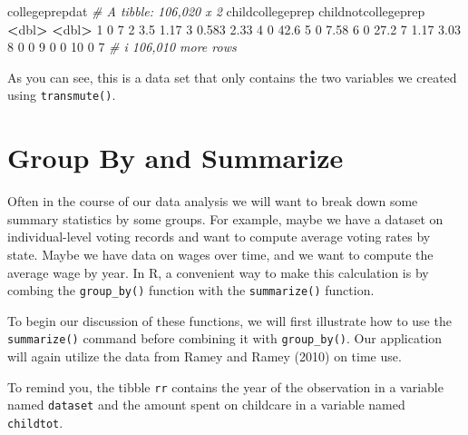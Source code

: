 \documentclass[
]{book}
\newenvironment{Shaded}{\begin{snugshade}}{\end{snugshade}}
\newcommand{\CommentTok}[1]{\textcolor[rgb]{0.56,0.35,0.01}{\textit{#1}}}
\newcommand{\DecValTok}[1]{\textcolor[rgb]{0.00,0.00,0.81}{#1}}
\newcommand{\ErrorTok}[1]{\textcolor[rgb]{0.64,0.00,0.00}{\textbf{#1}}}
\newcommand{\FloatTok}[1]{\textcolor[rgb]{0.00,0.00,0.81}{#1}}
\newcommand{\NormalTok}[1]{#1}
\newcommand{\SpecialCharTok}[1]{\textcolor[rgb]{0.81,0.36,0.00}{\textbf{#1}}}
\begin{document}
\begin{Shaded}
\begin{Highlighting}[]
\NormalTok{collegeprepdat}
\CommentTok{\# A tibble: 106,020 x 2}
\NormalTok{   childcollegeprep childnotcollegeprep}
              \SpecialCharTok{\textless{}}\NormalTok{dbl}\SpecialCharTok{\textgreater{}}               \ErrorTok{\textless{}}\NormalTok{dbl}\SpecialCharTok{\textgreater{}}
 \DecValTok{1}            \DecValTok{0}                    \DecValTok{7}   
 \DecValTok{2}            \FloatTok{3.5}                  \FloatTok{1.17}
 \DecValTok{3}            \FloatTok{0.583}                \FloatTok{2.33}
 \DecValTok{4}            \DecValTok{0}                   \FloatTok{42.6} 
 \DecValTok{5}            \DecValTok{0}                    \FloatTok{7.58}
 \DecValTok{6}            \DecValTok{0}                   \FloatTok{27.2} 
 \DecValTok{7}            \FloatTok{1.17}                 \FloatTok{3.03}
 \DecValTok{8}            \DecValTok{0}                    \DecValTok{0}   
 \DecValTok{9}            \DecValTok{0}                    \DecValTok{0}   
\DecValTok{10}            \DecValTok{0}                    \DecValTok{7}   
\CommentTok{\# i 106,010 more rows}
\end{Highlighting}
\end{Shaded}

As you can see, this is a data set that only contains the two variables we created using \texttt{transmute()}.

\section{Group By and Summarize}\label{group-by-and-summarize}

Often in the course of our data analysis we will want to break down some summary statistics by some groups. For example, maybe we have a dataset on individual-level voting records and want to compute average voting rates by state. Maybe we have data on wages over time, and we want to compute the average wage by year. In R, a convenient way to make this calculation is by combing the \texttt{group\_by()} function with the \texttt{summarize()} function.

To begin our discussion of these functions, we will first illustrate how to use the \texttt{summarize()} command before combining it with \texttt{group\_by()}. Our application will again utilize the data from Ramey and Ramey (2010) on time use.

To remind you, the tibble \texttt{rr} contains the year of the observation in a variable named \texttt{dataset} and the amount spent on childcare in a variable named \texttt{childtot}.
\end{document}
